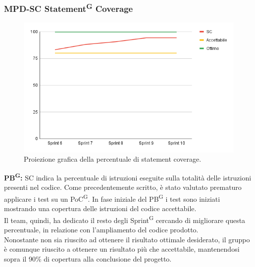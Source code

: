 \documentclass[8pt]{article}
\newcommand{\glossterm}[1]{#1\textsuperscript{G}} %
\begin{document}
\subsubsection{MPD-SC \glossterm{Statement} Coverage}
\begin{figure}[h!]
    \centering
    \includegraphics[width=1\textwidth]{images_pdq/SC.png}
    \caption{Proiezione grafica della percentuale di statement coverage.}
    \label{fig:Proiezione grafica della percentuale di statement coverage}
\end{figure}
\textbf{\glossterm{PB}:} SC indica la percentuale di istruzioni eseguite sulla totalità delle istruzioni presenti nel codice. Come precedentemente scritto, è stato valutato prematuro applicare i test su un \glossterm{PoC}. In fase iniziale del \glossterm{PB} i test sono iniziati mostrando una copertura delle istruzioni del codice accettabile. \\ Il team, quindi, ha dedicato il resto degli \glossterm{Sprint} cercando di migliorare questa percentuale, in relazione con l'ampliamento del codice prodotto. \\ Nonostante non sia riuscito ad ottenere il risultato ottimale desiderato, il gruppo è comunque riuscito a ottenere un risultato più che accettabile, mantenendosi sopra il 90\% di copertura alla conclusione del progetto.
\clearpage
\end{document}
